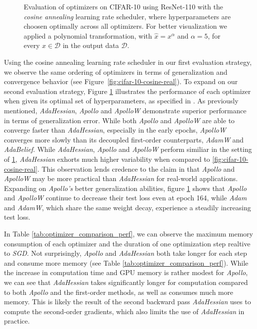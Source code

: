 \begin{figure}[h!]
    \centering
    \begin{tabular}{cc}
         \\ %
    \end{tabular}
    \caption{Evaluation of optimizers on CIFAR-10 using ResNet-110 with the \emph{cosine annealing} learning rate scheduler, where hyperparameters
    are choosen optimally across all optimizers. For better visualization we applied a polynomial transformation, with $\hat{x}=x^\alpha$ and $\alpha=5$, for every $x \in \mathcal{D}$ in the output data $ \mathcal{D}$. }
    \label{fig:cifar-10-cosine-second}
\end{figure}
Using the cosine annealing learning rate scheduler in our first evaluation strategy,
we observe the same ordering of optimizers in terms of generalization and convergence behavior (see Figure~\ref{fig:cifar-10-cosine-real}).
To expand on our second evaluation strategy, Figure \ref{fig:cifar-10-cosine-second}
illustrates the performance of each optimizer when given its optimal set of hyperparameters,
as specified in \cite{apollo}. As previously mentioned, \emph{AdaHessian}, \emph{Apollo} and 
\emph{ApolloW} demonstrate superior performance in terms of generalization error. While both \emph{Apollo} and \emph{ApolloW} are able to converge faster than \emph{AdaHessian},
especially in the early epochs, \emph{ApolloW} converges more slowly than its decoupled first-order counterparts,
\emph{AdamW} and \emph{AdaBelief}.
While \emph{AdaHessian}, \emph{Apollo} and \emph{ApolloW} perform similiar in the setting of 
\ref{fig:cifar-10-cosine-second}, \emph{AdaHessian} exhorts much higher variability when compared to 
\ref{fig:cifar-10-cosine-real}. This observation lends credence to the claim in \cite{apollo} that \emph{Apollo} and \emph{ApolloW} 
may be more practical than \emph{AdaHessian} for real-world applications.\\
Expanding on \emph{Apollo's} better generalization abilities, figure \ref{fig:cifar-10-cosine-second} shows that \emph{Apollo} and \emph{ApolloW} continue to decrease their
test loss even at epoch 164, while \emph{Adam} and \emph{AdamW}, which share the same weight decay,
experience a steadily increasing test loss.

In Table \ref{tab:optimizer_comparison_perf}, we can observe the maximum memory consumption
of each optimizer and the duration of one optimization step realtive to \emph{SGD}.
Not surprisingly, \emph{Apollo} and \emph{AdaHessian} both take longer for each step and
consume more memory (see Table \ref{tab:optimizer_comparison_perf}). While the increase in computation time and GPU memory is
rather modest for \emph{Apollo}, we can see that \emph{AdaHessian} takes significantly
longer for computation compared to both \emph{Apollo} and the first-order
 methods, as well as consumes much more memory. This is likely the result of
the second backward pass \emph{AdaHessian} uses to compute the second-order gradients,
which also limits the use of \emph{AdaHessian} in practice.


